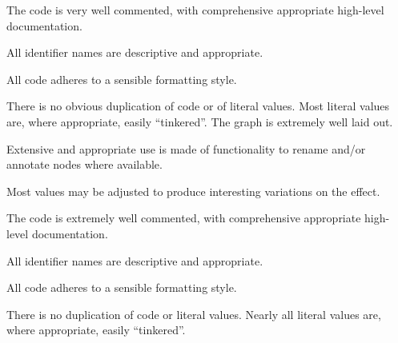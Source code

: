 \documentclass{../../../fal_assignment}
\begin{document}
\begin{markingrubric}
		\par The code is very well commented, with comprehensive appropriate high-level documentation.
		\par All identifier names are descriptive and appropriate.
		\par All code adheres to a sensible formatting style.
		\par There is no obvious duplication of code or of literal values. Most literal values are, where appropriate, easily ``tinkered''.  
	\grade The graph is extremely well laid out.
		\par Extensive and appropriate use is made of functionality to rename and/or annotate nodes where available.
		\par Most values may be adjusted to produce interesting variations on the effect.
		\par The code is extremely well commented, with comprehensive appropriate high-level documentation.
		\par All identifier names are descriptive and appropriate.
		\par All code adheres to a sensible formatting style.
		\par There is no duplication of code or literal values. Nearly all literal values are, where appropriate, easily ``tinkered''.
\end{markingrubric}
\end{document}
